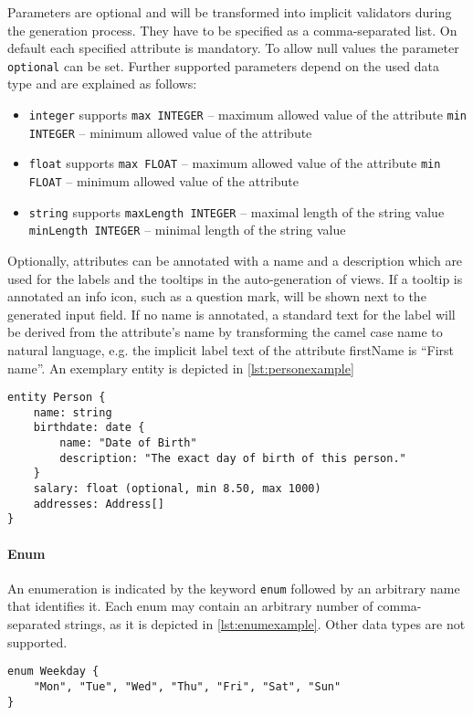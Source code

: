 Parameters are optional and will be transformed into implicit validators during the generation process. They have to be specified as a comma-separated list. On default each specified attribute is mandatory. To allow null values the parameter \lstinline!optional! can be set. Further supported parameters depend on the used data type and are explained as follows:

\begin{itemize}
\item \lstinline!integer! supports
\subitem \lstinline!max INTEGER! – maximum allowed value of the attribute
\subitem \lstinline!min INTEGER! – minimum allowed value of the attribute
\item \lstinline!float! supports
\subitem \lstinline!max FLOAT! – maximum allowed value of the attribute
\subitem \lstinline!min FLOAT! – minimum allowed value of the attribute
\item \lstinline!string! supports
\subitem \lstinline!maxLength INTEGER! – maximal length of the string value
\subitem \lstinline!minLength INTEGER! – minimal length of the string value
\end{itemize}

Optionally, attributes can be annotated with a name and a description which are used for the labels and the tooltips in the auto-generation of views. If a tooltip is annotated an info icon, such as a question mark, will be shown next to the generated input field. If no name is annotated, a standard text for the label will be derived from the attribute's name by transforming the camel case name to natural language, e.g. the implicit label text of the attribute firstName is \enquote{First name}. An exemplary entity is depicted in \ref{lst:personexample}

\begin{lstlisting}[language=MD2, label=lst:personexample, caption=Exemplary entity that represents a person]
entity Person {
	name: string
	birthdate: date {
		name: "Date of Birth"
		description: "The exact day of birth of this person."
	}
	salary: float (optional, min 8.50, max 1000)
	addresses: Address[]
}
\end{lstlisting}

\paragraph{Enum}
An enumeration is indicated by the keyword \lstinline!enum! followed by an arbitrary name that identifies it. Each enum may contain an arbitrary number of comma-separated strings, as it is depicted in \ref{lst:enumexample}. Other data types are not supported.

\begin{lstlisting}[language=MD2, label=lst:enumexample, caption=Exemplary enum element to specify weekdays]
enum Weekday {
	"Mon", "Tue", "Wed", "Thu", "Fri", "Sat", "Sun"
}
\end{lstlisting}